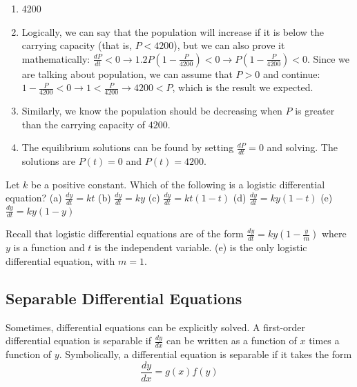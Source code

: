 \begin{Answer}[ref = logdiff1]
\begin{enumerate}
\item 4200
\item Logically, we can say that the population will increase if it is below 
the carrying capacity (that is, $P < 4200$), but we can also prove it 
mathematically: $\frac{dP}{dt} < 0 \rightarrow 1.2P \left( 1 - \frac{P}{4200} 
\right) < 0 \rightarrow P \left( 1 - \frac{P}{4200} \right) < 0$. Since we are 
talking about population, we can assume that $P > 0$ and continue: $1 - 
\frac{P}{4200} < 0 \rightarrow 1 < \frac{P}{4200} \rightarrow 4200 < P$, which 
is the result we expected. 
\item Similarly, we know the population should be decreasing when $P$ is 
greater than the carrying capacity of $4200$.
\item The equilibrium solutions can be found by setting $\frac{dP}{dt} = 0$ 
and solving. The solutions are $P(t) = 0$ and $P(t) = 4200$. 
\end{enumerate}
\end{Answer}

\begin{Exercise} Let $k$ be a positive constant. 
Which of the following is a logistic differential equation?
(a) $\frac{dy}{dt} = kt$
(b) $\frac{dy}{dt} = ky$
(c) $\frac{dy}{dt} = kt(1 - t)$
(d) $\frac{dy}{dt} = ky(1 - t)$
(e) $\frac{dy}{dt} = ky(1 - y)$
\end{Exercise}

\begin{Answer}[ref = logdiff2]
Recall that logistic differential equations are of the form $\frac{dy}{dt} = 
ky(1 - \frac{y}{m})$ where $y$ is a function and $t$ is the independent 
variable. (e) is the only logistic differential equation, with $m = 1$. 
\end{Answer}

\subsection{Separable Differential Equations}
Sometimes, differential equations can be explicitly solved. A 
first-order differential equation is separable if $\frac{dy}{dx}$ can 
be written as a function of $x$ times a function of $y$. Symbolically, 
a differential equation is separable if it takes the form 
$$\frac{dy}{dx} = g(x)f(y)$$

